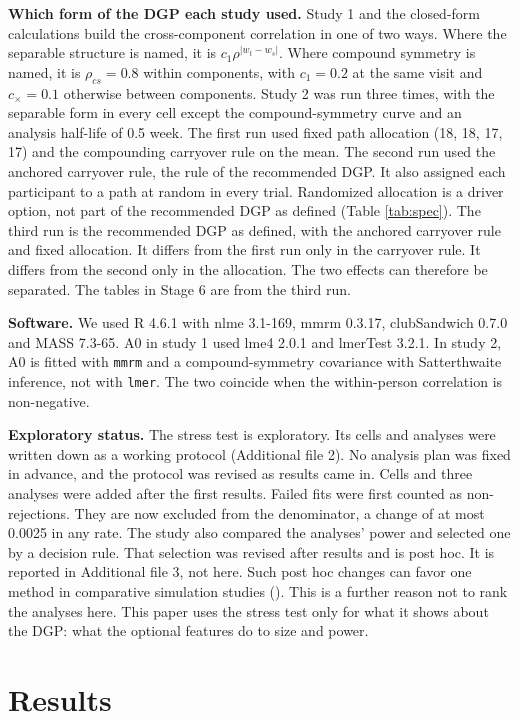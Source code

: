 \documentclass[
  11pt,
]{article}
\begin{document}
\textbf{Which form of the DGP each study used.} Study 1 and the closed-form
calculations build the cross-component correlation in one of two ways.
Where the separable structure is named, it is
\(c_1\rho^{\lvert w_t - w_s\rvert}\). Where compound symmetry is named,
it is \(\rho_{cs} = 0.8\) within components, with \(c_1 = 0.2\) at the same
visit and \(c_\times = 0.1\) otherwise between components. Study 2 was
run three times, with the separable form in every cell except the
compound-symmetry curve and an analysis half-life of 0.5 week. The
first run used fixed path allocation (18, 18, 17, 17) and the
compounding carryover rule on the mean. The second run used the
anchored carryover rule, the rule of the recommended DGP. It also
assigned each participant to a path at random in every trial.
Randomized allocation is a driver option, not part of the recommended
DGP as defined (Table \ref{tab:spec}). The third run is the
recommended DGP as defined, with the anchored carryover rule and fixed
allocation. It differs from the first run only in the
carryover rule. It differs from the second only in the allocation. The
two effects can therefore be separated. The tables in Stage 6 are from
the third run.

\textbf{Software.} We used R 4.6.1 with nlme 3.1-169, mmrm 0.3.17,
clubSandwich 0.7.0 and MASS 7.3-65. A0 in study 1 used lme4 2.0.1
and lmerTest 3.2.1. In study 2, A0 is fitted with \texttt{mmrm} and a
compound-symmetry covariance with
Satterthwaite inference, not with \texttt{lmer}. The two coincide when the
within-person correlation is non-negative.

\textbf{Exploratory status.} The stress test is exploratory. Its cells and
analyses were written down as a working protocol (Additional file 2).
No analysis plan was fixed in advance, and the protocol was revised as
results came in. Cells and three analyses were added after the first
results. Failed fits were first counted as non-rejections. They are
now excluded from the denominator, a change of at most 0.0025 in any
rate. The study also compared the analyses' power and selected one by
a decision rule. That selection was revised after results and is post
hoc. It is reported in Additional file 3, not here. Such post hoc
changes can favor one method in comparative simulation studies
(). This is a further reason not to rank the
analyses here. This paper uses the stress test only for what it shows
about the DGP: what the optional features do to size and power.

\section{Results}\label{results}
\end{document}
